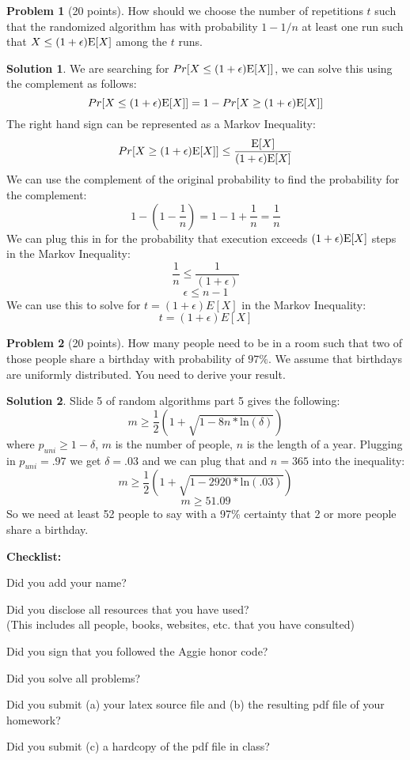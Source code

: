 \documentclass{article}
\theoremstyle{definition}
\newtheorem{problem}{Problem}
\newtheorem*{solution}{Solution}
\newcommand{\E}{\textup{E}}
\newcommand{\checklist}{\noindent\textbf{Checklist:}
\begin{compactitem}[$\Box$] 
\item Did you add your name? 
\item Did you disclose all resources that you have used? \\
(This includes all people, books, websites, etc. that you have consulted)
\item Did you sign that you followed the Aggie honor code? 
\item Did you solve all problems? 
\item Did you submit (a) your latex source file and (b) the resulting pdf file
  of your homework?
\item Did you submit (c) a hardcopy of the pdf file in class? 
\end{compactitem}
}
\begin{document}
\begin{problem} [20 points] How should we choose the number of repetitions $t$
  such that the randomized algorithm has with probability $1-1/n$ at
  least one run such that $X\le (1+\epsilon)\E[X]$ among the $t$ runs.
\end{problem}
\begin{solution}
We are searching for $Pr[X \leq (1+\epsilon)\E[X]]$, we can solve this using the complement as follows:
$$ Pr[X \leq (1+\epsilon)\E[X]] = 1 - Pr[X \geq (1+\epsilon)\E[X]] $$
The right hand sign can be represented as a Markov Inequality:
$$ Pr[X \geq (1+\epsilon)\E[X]] \leq \frac{\E[X]}{(1+\epsilon)\E[X]} $$
We can use the complement of the original probability to find the probability for the complement:
$$ 1 - (1 - \frac{1}{n}) = 1 - 1 + \frac{1}{n} = \frac{1}{n} $$
We can plug this in for the probability that execution exceeds $(1+\epsilon)\E[X]$ steps in the Markov Inequality:
$$ \frac{1}{n} \leq \frac{1}{(1+\epsilon)} $$
$$ \epsilon \leq n -1 $$
We can use this to solve for $t = (1+\epsilon)E[X]$ in the Markov Inequality:
$$ t = (1+ \epsilon)E[X] $$
\end{solution}

\begin{problem}[20 points] How many people need to be in a room such that two of
  those   people share a birthday with
  probability of $97\%$.  We assume that birthdays are uniformly
  distributed. You need to derive your result. 
\end{problem}
\begin{solution}
Slide 5 of random algorithms part 5 gives the following:
$$m \geq \frac{1}{2}(1 + \sqrt{1-8n*\text{ln}(\delta)})$$
where $p_{uni} \geq 1 - \delta$, $m$ is the number of people, $n$ is the length of a year. Plugging in $p_{uni}=.97$ we get $\delta = .03$ and we can plug that and $n=365$ into the inequality:
$$ m \geq \frac{1}{2}(1 + \sqrt{1-2920*\text{ln}(.03)}) $$
$$ m \geq 51.09$$
So we need at least 52 people to say with a 97\% certainty that 2 or more people share a birthday.
\end{solution}



\goodbreak
\checklist
\end{document}
